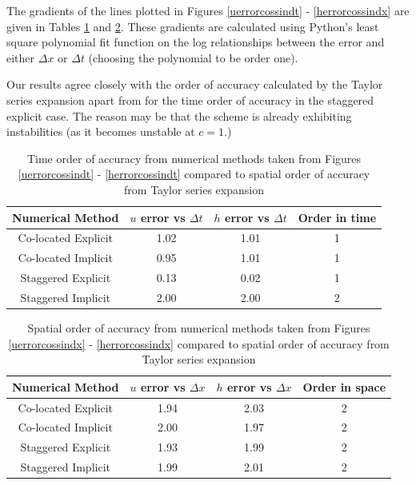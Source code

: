 \documentclass[a4paper, 10.8pt, notitlepage]{article}
\begin{document}
The gradients of the lines plotted in Figures \ref{uerrorcossindt} - \ref{herrorcossindx}  are given in Tables \ref{gradientdt} and \ref{gradientdx}. These gradients are calculated using Python's least square polynomial fit function on the log relationships between the error and either $\Delta x$ or $\Delta t$ (choosing the polynomial to be order one). 

Our results agree closely with the order of accuracy calculated by the Taylor series expansion apart from for the time order of accuracy in the staggered explicit case. The reason may be that the scheme is already exhibiting instabilities (as it becomes unstable at $c = 1$.)


\begin{table}[H]
	\centering
	\begin{tabular}{|c | c| c| c|} 
		\hline
		\textbf{Numerical Method}  & $u$ error vs $\Delta t$ & $h$ error vs $\Delta t$ & Order in time \\
		\hline
		Co-located Explicit & 1.02 & 1.01 & 1\\ 
		\hline
		Co-located Implicit & 0.95 & 1.01 & 1\\
		\hline
		Staggered Explicit & 0.13 & 0.02 & 1\\
		\hline
		Staggered Implicit & 2.00 & 2.00 & 2\\
		\hline
	\end{tabular}
	\caption{Time order of accuracy from numerical methods taken from Figures \ref{uerrorcossindt} - \ref{herrorcossindt} compared to spatial order of accuracy from Taylor series expansion}
	\label{gradientdt}
\end{table}

\begin{table}[H]
	\centering
	\begin{tabular}{|c | c| c| c|} 
		\hline
		\textbf{Numerical Method} & $u$ error vs $\Delta x$ &  $h$ error vs $\Delta x$ & Order in space\\
		\hline
		Co-located Explicit & 1.94 & 2.03 & 2 \\ 
		\hline
		Co-located Implicit & 2.00 & 1.97 & 2 \\
		\hline
		Staggered Explicit & 1.93 & 1.99 & 2 \\
		\hline
		Staggered Implicit & 1.99 & 2.01 & 2 \\
		\hline
	\end{tabular}
	\caption{Spatial order of accuracy from numerical methods taken from Figures \ref{uerrorcossindx} - \ref{herrorcossindx} compared to spatial order of accuracy from Taylor series expansion}
	\label{gradientdx}
\end{table}
\end{document}
